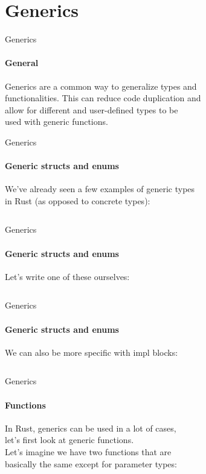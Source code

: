 \documentclass[usenames,dvipsnames,10pt,aspectratio=169]{beamer}
\begin{document}

\section{Generics}

\begin{frame}{Generics}
	\framesubtitle{General}
	\Large
	Generics are a common way to generalize types and\\
	functionalities. This can reduce code duplication and\\
	allow for different and user-defined types to be\\
	used with generic functions.\\
	\vspace{0.4cm}
\end{frame}

\begin{frame}{Generics}
	\framesubtitle{Generic structs and enums}
	\large
	We've already seen a few examples of generic types\\
	in Rust (as opposed to concrete types): 
	\vspace{0.2cm}
	\inputminted[fontsize=\large]{rust}{code/generics1.rs}
\end{frame}

\begin{frame}{Generics}
	\framesubtitle{Generic structs and enums}
	Let's write one of these ourselves:
	\vspace{0.2cm}
	\inputminted[fontsize=\large]{rust}{code/generics2.rs}
\end{frame}

\begin{frame}{Generics}
	\framesubtitle{Generic structs and enums}
	\large
	We can also be more specific with \textcolor{ucuyellow}{impl} blocks:
	\vspace{0.2cm}
	\inputminted[fontsize=\large]{rust}{code/generics3.rs}
\end{frame}

\begin{frame}{Generics}
	\framesubtitle{Functions}
	\large
	In Rust, generics can be used in a lot of cases,\\
	let's first look at \textcolor{ucuyellow}{generic functions}.\\
	\vspace{0.2cm}
	Let's imagine we have two functions that are\\
	basically the same except for parameter types:\\
	\vspace{0.2cm}
	\inputminted[fontsize=\large]{rust}{code/generics4.rs}
\end{frame}
\end{document}
